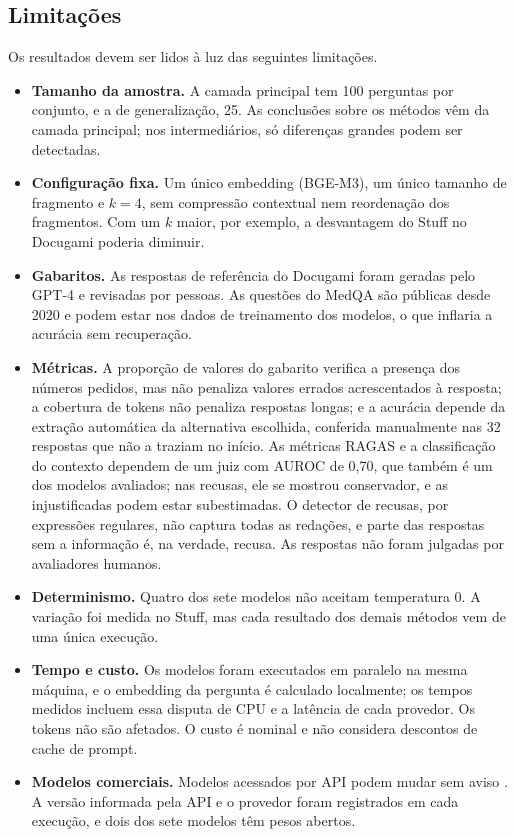 \subsection{Limitações}

Os resultados devem ser lidos à luz das seguintes limitações.

\begin{itemize}
  \item \textbf{Tamanho da amostra.} A camada principal tem 100 perguntas por conjunto, e a de generalização, 25. As conclusões sobre os métodos vêm da camada principal; nos intermediários, só diferenças grandes podem ser detectadas.
  \item \textbf{Configuração fixa.} Um único embedding (BGE-M3), um único tamanho de fragmento e $k = 4$, sem compressão contextual nem reordenação dos fragmentos. Com um $k$ maior, por exemplo, a desvantagem do Stuff no Docugami poderia diminuir.
  \item \textbf{Gabaritos.} As respostas de referência do Docugami foram geradas pelo GPT-4 e revisadas por pessoas. As questões do MedQA são públicas desde 2020 e podem estar nos dados de treinamento dos modelos, o que inflaria a acurácia sem recuperação.
  \item \textbf{Métricas.} A proporção de valores do gabarito verifica a presença dos números pedidos, mas não penaliza valores errados acrescentados à resposta; a cobertura de tokens não penaliza respostas longas; e a acurácia depende da extração automática da alternativa escolhida, conferida manualmente nas 32 respostas que não a traziam no início. As métricas RAGAS e a classificação do contexto dependem de um juiz com AUROC de 0,70, que também é um dos modelos avaliados; nas recusas, ele se mostrou conservador, e as injustificadas podem estar subestimadas. O detector de recusas, por expressões regulares, não captura todas as redações, e parte das respostas sem a informação é, na verdade, recusa. As respostas não foram julgadas por avaliadores humanos.
  \item \textbf{Determinismo.} Quatro dos sete modelos não aceitam temperatura 0. A variação foi medida no Stuff, mas cada resultado dos demais métodos vem de uma única execução.
  \item \textbf{Tempo e custo.} Os modelos foram executados em paralelo na mesma máquina, e o embedding da pergunta é calculado localmente; os tempos medidos incluem essa disputa de CPU e a latência de cada provedor. Os tokens não são afetados. O custo é nominal e não considera descontos de cache de prompt.
  \item \textbf{Modelos comerciais.} Modelos acessados por API podem mudar sem aviso \cite{chen2024chatgptbehavior}. A versão informada pela API e o provedor foram registrados em cada execução, e dois dos sete modelos têm pesos abertos.
\end{itemize}
